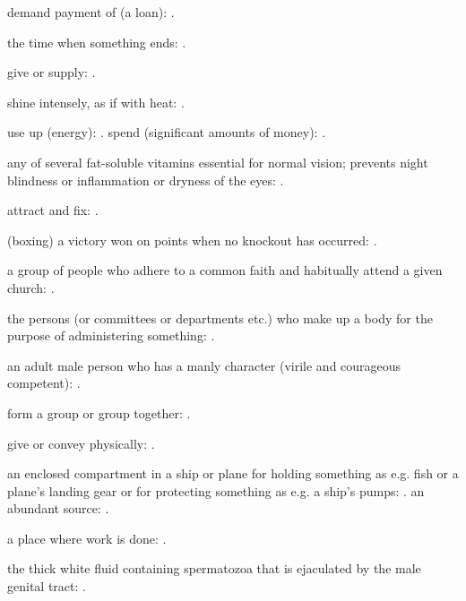   demand payment of (a loan): .

  the time when something ends:   .

  give or supply:   .

  shine intensely, as if with heat:   .

  use up (energy):   . spend (significant amounts of money): .

  any of several fat-soluble vitamins essential for normal vision; prevents night blindness or inflammation or dryness of the eyes:   .

  attract and fix:   .

  (boxing) a victory won on points when no knockout has occurred: .

  a group of people who adhere to a common faith and habitually attend a given church:   .

  the persons (or committees or departments etc.) who make up a body for the purpose of administering something:   .

  an adult male person who has a manly character (virile and courageous competent): .

  form a group or group together:   .

  give or convey physically:   .

  an enclosed compartment in a ship or plane for holding something as e.g. fish or a plane's landing gear or for protecting something as e.g. a ship's pumps: . an abundant source:   .

  a place where work is done:   .

  the thick white fluid containing spermatozoa that is ejaculated by the male genital tract:   .

